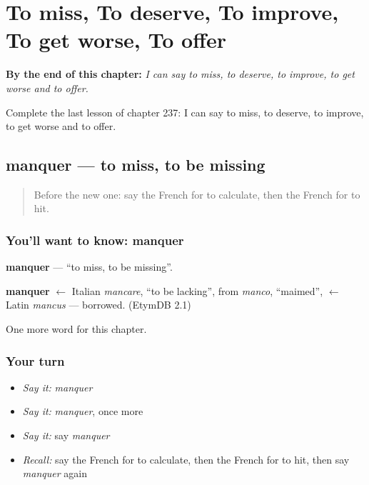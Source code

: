 
\chapter{To miss, To deserve, To improve, To get worse, To offer}
\label{ch:fr-to-miss-to-deserve-to-improve-to-get-worse-to-offer}

\begin{chapteropening}
\textbf{By the end of this chapter:} \emph{I can say to miss, to deserve, to improve, to get worse and to offer.}

Complete the last lesson of chapter 237: I can say to miss, to deserve, to improve, to get worse and to offer.
\end{chapteropening}

\section[manquer]{manquer — to miss, to be missing}

\label{lesson:FR-C237-manquer}



\begin{quote}
Before the new one: say the French for to calculate, then the French for to hit.
\end{quote}

\subsection*{You'll want to know: manquer}
\textbf{manquer} — \textquotedblleft{}to miss, to be missing\textquotedblright{}.

\begin{cousinweb}
\textbf{manquer} $\leftarrow$ Italian \emph{mancare}, \textquotedblleft{}to be lacking\textquotedblright{}, from \emph{manco}, \textquotedblleft{}maimed\textquotedblright{}, $\leftarrow$ Latin \emph{mancus} — borrowed. (EtymDB 2.1)
\end{cousinweb}

\begin{grammarlens}[title={What you've built}]
One more word for this chapter.
\end{grammarlens}

\subsection*{Your turn}
\begin{itemize}
\raggedright
  \item \emph{Say it:} \emph{manquer}
  \item \emph{Say it:} \emph{manquer}, once more
  \item \emph{Say it:} say \emph{manquer}
  \item \emph{Recall:} say the French for to calculate, then the French for to hit, then say \emph{manquer} again
\end{itemize}

